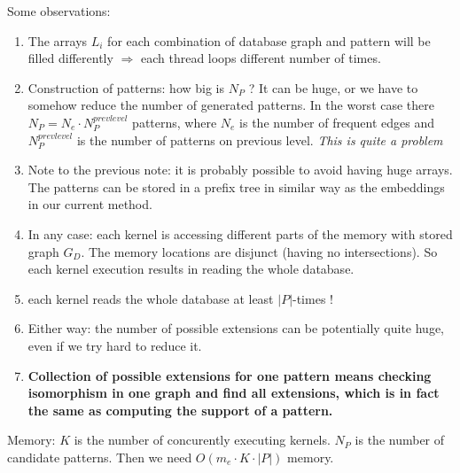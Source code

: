 \documentclass[a4paper,11pt]{article}
\begin{document}
\noindent Some observations:
\begin{enumerate}
\item The arrays $L_i$ for each combination of database graph and pattern will be filled differently
  $\Rightarrow$ each thread loops different number of times.
\item Construction of patterns: how big is $N_P$ ? It can be huge, or we have to somehow reduce the
  number of generated patterns. In the worst case there $N_P = N_e\cdot N^{prev level}_P$ patterns,
  where $N_e$ is the number of frequent edges and $N^{prev level}_P$ is the number of patterns on
  previous level. \emph{This is quite a problem}

\item Note to the previous note: it is probably possible to avoid having huge arrays. The patterns
  can be stored in a prefix tree in similar way as the embeddings in our current method.

\item In any case: each kernel is accessing different parts of the memory with stored graph
  $G_D$. The memory locations are disjunct (having no intersections). So each kernel execution
  results in reading the whole database.
\item each kernel reads the whole database at least $|P|$-times !

\item Either way: the number of possible extensions can be potentially quite huge, even if we try
  hard to reduce it. 
\item \textbf{Collection of possible extensions for one pattern means checking isomorphism in one graph and
  find all extensions, which is in fact the same as computing the support of a pattern.}
\end{enumerate}

\noindent Memory: $K$ is the number of concurently executing kernels. $N_P$ is the number of candidate patterns. Then we need $O(m_e\cdot K\cdot |P|)$ memory.
\end{document}
